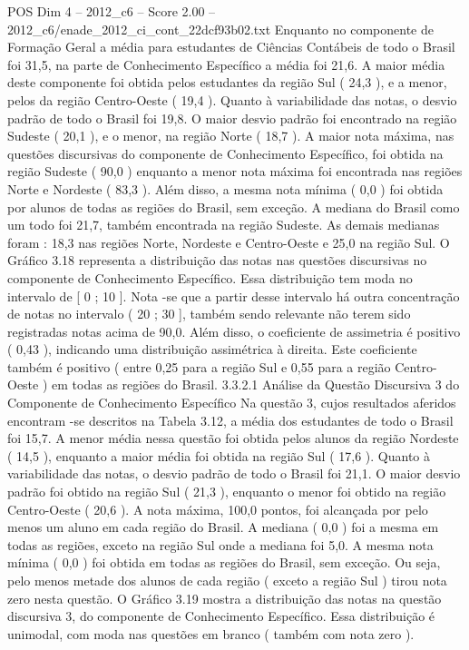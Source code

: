 \begin{textsample}{POS Dim 4 – 2012\_c6 – Score 2.00 – 2012\_c6/enade\_2012\_ci\_cont\_22dcf93b02.txt}
Enquanto no componente de Formação Geral a média para estudantes de Ciências Contábeis de todo o Brasil foi 31,5, na parte de Conhecimento Específico a média foi 21,6.
A maior média deste componente foi obtida pelos estudantes da região Sul ( 24,3 ), e a menor, pelos da região Centro-Oeste ( 19,4 ).
Quanto à variabilidade das notas, o desvio padrão de todo o Brasil foi 19,8.
O maior desvio padrão foi encontrado na região Sudeste ( 20,1 ), e o menor, na região Norte ( 18,7 ).
A maior nota máxima, nas questões discursivas do componente de Conhecimento Específico, foi obtida na região Sudeste ( 90,0 ) enquanto a menor nota máxima foi encontrada nas regiões Norte e Nordeste ( 83,3 ).
Além disso, a mesma nota mínima ( 0,0 ) foi obtida por alunos de todas as regiões do Brasil, sem exceção.
A mediana do Brasil como um todo foi 21,7, também encontrada na região Sudeste.
As demais medianas foram : 18,3 nas regiões Norte, Nordeste e Centro-Oeste e 25,0 na região Sul.
O Gráfico 3.18 representa a distribuição das notas nas questões discursivas no componente de Conhecimento Específico.
Essa distribuição tem moda no intervalo de [ 0 ; 10 ].
Nota -se que a partir desse intervalo há outra concentração de notas no intervalo ( 20 ; 30 ], também sendo relevante não terem sido registradas notas acima de 90,0.
Além disso, o coeficiente de assimetria é positivo ( 0,43 ), indicando uma distribuição assimétrica à direita.
Este coeficiente também é positivo ( entre 0,25 para a região Sul e 0,55 para a região Centro-Oeste ) em todas as regiões do Brasil. 3.3.2.1 Análise da Questão Discursiva 3 do Componente de Conhecimento Específico Na questão 3, cujos resultados aferidos encontram -se descritos na Tabela 3.12, a média dos estudantes de todo o Brasil foi 15,7.
A menor média nessa questão foi obtida pelos alunos da região Nordeste ( 14,5 ), enquanto a maior média foi obtida na região Sul ( 17,6 ).
Quanto à variabilidade das notas, o desvio padrão de todo o Brasil foi 21,1.
O maior desvio padrão foi obtido na região Sul ( 21,3 ), enquanto o menor foi obtido na região Centro-Oeste ( 20,6 ).
A nota máxima, 100,0 pontos, foi alcançada por pelo menos um aluno em cada região do Brasil.
A mediana ( 0,0 ) foi a mesma em todas as regiões, exceto na região Sul onde a mediana foi 5,0.
A mesma nota mínima ( 0,0 ) foi obtida em todas as regiões do Brasil, sem exceção.
Ou seja, pelo menos metade dos alunos de cada região ( exceto a região Sul ) tirou nota zero nesta questão.
O Gráfico 3.19 mostra a distribuição das notas na questão discursiva 3, do componente de Conhecimento Específico.
Essa distribuição é unimodal, com moda nas questões em branco ( também com nota zero ).

\end{textsample}
